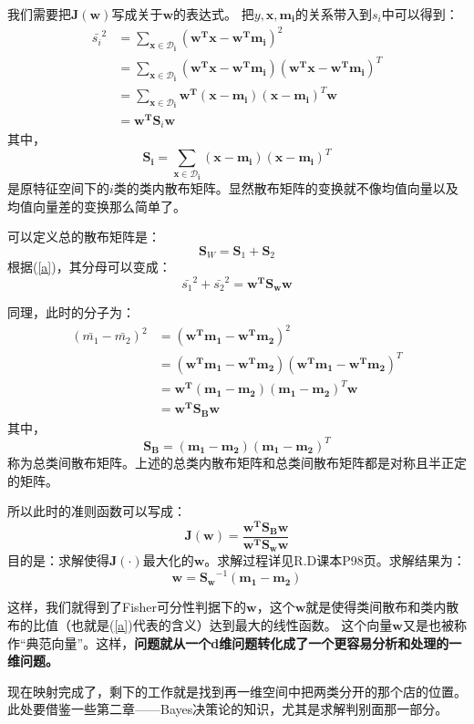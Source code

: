 \documentclass[12pt, letterpaper]{article}
\begin{document}
我们需要把$\mathbf{J(w)}$写成关于$\mathbf{w}$的表达式。
把$y,\mathbf{x},\mathbf{m_i}$的关系带入到$s_i$中可以得到：
$$
\begin{aligned}
\bar{s_i}^2&=\sum_{\mathbf{x\in \mathscr{D}_i}}(\mathbf{w^Tx}-\mathbf{w^Tm_i})^2\\
&=\sum_{\mathbf{x\in \mathscr{D}_i}}(\mathbf{w^Tx}-\mathbf{w^Tm_i})(\mathbf{w^Tx}-\mathbf{w^Tm_i})^T\\
&=\sum_{\mathbf{x\in \mathscr{D}_i}}\mathbf{w^T}(\mathbf{x}-\mathbf{m_i})(\mathbf{x}-\mathbf{m_i})^T\mathbf{w}\\
&=\mathbf{w^T}\mathbf{S}_i\mathbf{w}
\end{aligned}
$$
其中，
$$
\mathbf{S_i}=\sum_{\mathbf{x\in \mathscr{D}_i}}(\mathbf{x}-\mathbf{m_i})(\mathbf{x}-\mathbf{m_i})^T
$$
是原特征空间下的$i$类的类内散布矩阵。显然散布矩阵的变换就不像均值向量以及均值向量差的变换那么简单了。

可以定义总的散布矩阵是：
$$
\mathbf{S}_W=\mathbf{S}_1 + \mathbf{S}_2
$$
根据(\ref{a})，其分母可以变成：
$$ 
\bar{s_1}^2 + \bar{s_2}^2 = \mathbf{w^TS_ww}
$$

同理，此时的分子为：
$$
\begin{aligned}
(\bar{m_1}-\bar{m_2})^2&=(\mathbf{w^Tm_1}-\mathbf{w^Tm_2})^2\\
&=(\mathbf{w^Tm_1}-\mathbf{w^Tm_2})(\mathbf{w^Tm_1}-\mathbf{w^Tm_2})^T\\
&=\mathbf{w^T}(\mathbf{m_1}-\mathbf{m_2})(\mathbf{m_1}-\mathbf{m_2})^T\mathbf{w}\\
&=\mathbf{w^T}\mathbf{S_B}\mathbf{w}
\end{aligned}
$$
其中，
$$
\mathbf{S_B}=(\mathbf{m_1}-\mathbf{m_2})(\mathbf{m_1}-\mathbf{m_2})^T
$$
称为总类间散布矩阵。上述的总类内散布矩阵和总类间散布矩阵都是对称且半正定的矩阵。

所以此时的准则函数可以写成：
\begin{equation}
\mathbf{J(w)}=\frac{\mathbf{w^TS_Bw}}{\mathbf{w^TS_ww}}
\end{equation}
目的是：求解使得$\mathbf{J(\cdot)}$最大化的$\mathbf{w}$。求解过程详见R.D课本P98页。求解结果为：
$$
\mathbf{w}=\mathbf{S_w}^{-1}(\mathbf{m_1}-\mathbf{m_2})
$$

这样，我们就得到了Fisher可分性判据下的$\mathbf{w}$，这个$\mathbf{w}$就是使得类间散布和类内散布的比值（也就是(\ref{a})代表的含义）达到最大的线性函数。
这个向量$\mathbf{w}$又是也被称作“典范向量”。这样，\textbf{问题就从一个d维问题转化成了一个更容易分析和处理的一维问题。}

现在映射完成了，剩下的工作就是找到再一维空间中把两类分开的那个店的位置。此处要借鉴一些第二章——Bayes决策论的知识，尤其是求解判别面那一部分。
\end{document}
